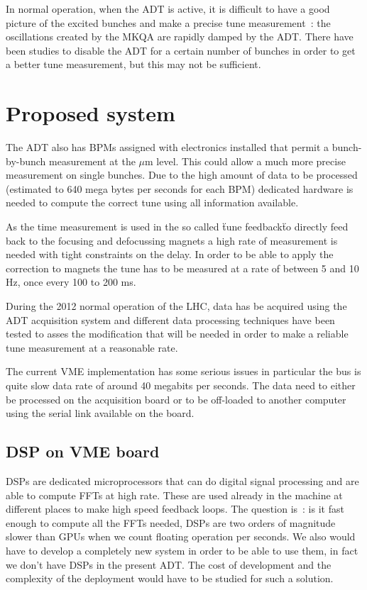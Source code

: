 In normal operation, when the \gls{ADT} is active, it is difficult to have a good picture of the excited bunches and make a precise tune measurement~: the oscillations created by the \gls{MKQA} are rapidly damped by the \gls{ADT}. There have been studies to disable the \gls{ADT} for a certain number of bunches in order to get a better tune measurement\cite{HofleEvian11}, but this may not be sufficient.

\section{Proposed system}

The \gls{ADT} also has \glspl{BPM} assigned with electronics installed that permit a bunch-by-bunch measurement at the $\mu$m level\cite{BphMeas07}. This could allow a much more precise measurement on single bunches. Due to the high amount of data to be processed (estimated to 640 mega bytes per seconds for each \gls{BPM}) dedicated hardware is needed to compute the correct tune using all information available\cite{HofleChamonix12}.

As the time measurement is used in the so called \"tune feedback\" to directly feed back to the focusing and defocussing magnets a high rate of measurement is needed with tight constraints on the delay. In order to be able to apply the correction to magnets the \gls{tune} has to be measured at a rate of between 5 and 10 Hz, once every 100 to 200 ms.

During the 2012 normal operation of the \gls{LHC}, data has be acquired using the \gls{ADT} acquisition system and different data processing techniques have been tested to asses the modification that will be needed in order to make a reliable \gls{tune} measurement at a reasonable rate\cite{HofleChamonix12}.

The current \gls{VME} implementation has some serious issues in particular the bus is quite slow data rate of around 40 megabits per seconds. The data need to either be processed on the acquisition board or to be off-loaded to another computer using the serial link available on the board\cite{Baudrenghien:1124094}.

\subsection{DSP on VME board}

\Glspl{DSP} are dedicated microprocessors that can do digital signal processing and are able to compute \glspl{FFT} at high rate. These are used already in the machine at different places to make high speed feedback loops. The question is~: is it fast enough to compute all the \glspl{FFT} needed, \glspl{DSP} are two orders of magnitude slower than \glspl{GPU} when we count floating operation per seconds. We also would have to develop a completely new system in order to be able to use them, in fact we don't have \glspl{DSP} in the present \gls{ADT}. The cost of development and the complexity of the deployment would have to be studied for such a solution.

